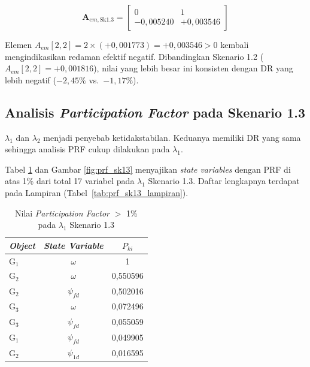 \begin{equation}
    \mathbf{A}_{em,\text{Sk1.3}} =
    \begin{bmatrix}
        0 & 1 \\[4pt]
        -0{,}005240 & +0{,}003546
    \end{bmatrix}
    \label{eq:Aem_sk13}
\end{equation}

Elemen $A_{em}[2,2] = 2\times(+0{,}001773) = +0{,}003546 > 0$ kembali
mengindikasikan redaman efektif negatif. Dibandingkan Skenario 1.2
($A_{em}[2,2] = +0{,}001816$), nilai yang lebih besar ini konsisten dengan
DR yang lebih negatif ($-2{,}45\%$ vs.\ $-1{,}17\%$).

\subsection{Analisis \textit{Participation Factor} pada Skenario 1.3}
\label{subsec:prf_sk13}

$\lambda_1$ dan $\lambda_2$ menjadi penyebab ketidakstabilan. Keduanya memiliki
DR yang sama sehingga analisis PRF cukup dilakukan pada $\lambda_1$.

Tabel \ref{tab:prf_sk13} dan Gambar \ref{fig:prf_sk13} menyajikan \textit{state variables}
dengan PRF di atas 1\% dari total 17 variabel pada $\lambda_1$ Skenario 1.3.
Daftar lengkapnya terdapat pada Lampiran (Tabel~\ref{tab:prf_sk13_lampiran}).

\begin{table}[H]
	\caption{Nilai \textit{Participation Factor} $>$ 1\% pada $\lambda_1$
	Skenario 1.3}
	\vspace{0.5em}
	\centering
	\fontsize{12}{14.4}\selectfont
	\setlength{\tabcolsep}{10pt}
	\begin{tabular}{l c c}
		\toprule
		\multicolumn{1}{c}{\textbf{\textit{Object}}} & \textbf{\textit{State
		Variable}} & \textbf{$P_{ki}$} \\
		\midrule
		G$_1$ & $\omega$ & 1        \\
		G$_2$ & $\omega$ & 0,550596 \\
		G$_2$ & $\psi_{fd}$ & 0,502016 \\
		G$_3$ & $\omega$ & 0,072496 \\
		G$_3$ & $\psi_{fd}$ & 0,055059 \\
		G$_1$ & $\psi_{fd}$ & 0,049905 \\
		G$_2$ & $\psi_{1d}$ & 0,016595 \\
		\bottomrule
	\end{tabular}
	\label{tab:prf_sk13}
\end{table}

